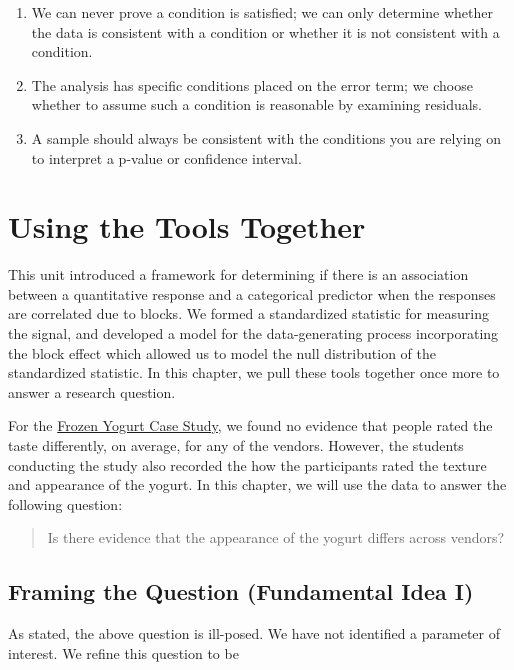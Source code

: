 \documentclass[]{book}
\providecommand{\tightlist}{%
  \setlength{\itemsep}{0pt}\setlength{\parskip}{0pt}}
\theoremstyle{plain}
\theoremstyle{mydefn}
\theoremstyle{myexmpl}
\theoremstyle{remark}
\begin{document}
\begin{enumerate}
\def\labelenumi{\arabic{enumi}.}
\tightlist
\item
  We can never prove a condition is satisfied; we can only determine
  whether the data is consistent with a condition or whether it is not
  consistent with a condition.
\item
  The analysis has specific conditions placed on the error term; we
  choose whether to assume such a condition is reasonable by examining
  residuals.
\item
  A sample should always be consistent with the conditions you are
  relying on to interpret a p-value or confidence interval.
\end{enumerate}

\chapter{Using the Tools Together}\label{Blockrecap}

This unit introduced a framework for determining if there is an
association between a quantitative response and a categorical predictor
when the responses are correlated due to blocks. We formed a
standardized statistic for measuring the signal, and developed a model
for the data-generating process incorporating the block effect which
allowed us to model the null distribution of the standardized statistic.
In this chapter, we pull these tools together once more to answer a
research question.

For the \protect\hyperlink{CaseYogurt}{Frozen Yogurt Case Study}, we
found no evidence that people rated the taste differently, on average,
for any of the vendors. However, the students conducting the study also
recorded the how the participants rated the texture and appearance of
the yogurt. In this chapter, we will use the data to answer the
following question:

\begin{quote}
Is there evidence that the appearance of the yogurt differs across
vendors?
\end{quote}

\section{Framing the Question (Fundamental Idea
I)}\label{framing-the-question-fundamental-idea-i-2}

As stated, the above question is ill-posed. We have not identified a
parameter of interest. We refine this question to be
\end{document}
